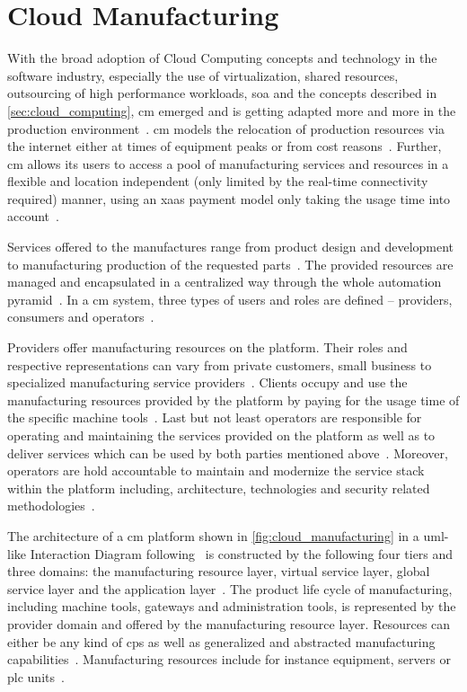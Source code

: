 \documentclass[
a4paper,
twoside,
headsepline,
cleardoublepage=empty,
parskip=half,
draft=false
]{scrbook}
\begin{document}
		\section{Cloud Manufacturing}\label{sec:cloud_manufacturing}

			With the broad adoption of Cloud Computing concepts and technology in the software industry, especially the use of virtualization, shared resources, outsourcing of high performance workloads, \gls{soa} and the concepts described in \cref{sec:cloud_computing}, \gls{cm} emerged and is getting adapted more and more in the production environment~\cite{he2015state}. \gls{cm} models the relocation of production resources via the internet either at times of equipment peaks or from cost reasons~\cite{wu2013cloud}. Further, \gls{cm} allows its users to access a pool of manufacturing services and resources in a flexible and location independent (only limited by the real-time connectivity required) manner, using an \gls{xaas} payment model only taking the usage time into account~\cite{macia2012cloud}.

			Services offered to the manufactures range from product design and development to manufacturing production of the requested parts~\cite{xu2012cloud}. The provided resources  are managed and encapsulated in a centralized way through the whole automation pyramid~\cite{kleinemeier2014automatisierungspyramide}.
			In a \gls{cm} system, three types of users and roles are defined -- providers, consumers and operators~\cite{wu2013cloud}.

			Providers offer manufacturing resources on the platform.
			Their roles and respective representations can vary from private customers, small business to specialized manufacturing service providers~\cite{tao2014cciot}.
			Clients occupy and use the manufacturing resources provided by the platform by paying for the usage time of the specific machine tools~\cite{he2015state}.
			Last but not least operators are responsible for operating and maintaining the services provided on the platform as well as to deliver services which can be used by both parties mentioned above~\cite{xu2012cloud}.
			Moreover, operators are hold accountable to maintain and modernize the service stack within the platform including, architecture, technologies and security related methodologies~\cite{tedeschi2015security}.
			
			The architecture of a \gls{cm} platform shown in \cref{fig:cloud_manufacturing} in a \gls{uml}-like Interaction Diagram following~\cite{uml2017} is constructed by the following four tiers and three domains: the manufacturing resource layer, virtual service layer, global service layer and the application layer~\cite{wu2013cloud}.
			The product life cycle of manufacturing, including machine tools, gateways and administration tools, is represented by the provider domain and offered by the manufacturing resource layer.
			Resources can either be any kind of \gls{cps} as well as generalized and abstracted manufacturing capabilities~\cite{kleinemeier2014automatisierungspyramide}.
			Manufacturing resources include for instance equipment, servers or \gls{plc} units~\cite{brettel2014virtualization}.
			
\end{document}
